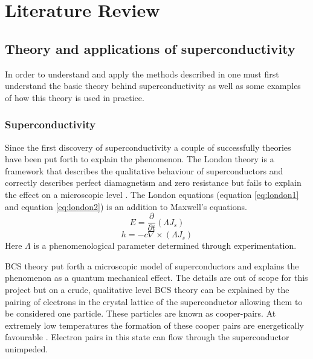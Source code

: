 \graphicspath{{litreview/fig/}}

\chapter{Literature Review}
\label{chap:litreview}


\section{Theory and applications of superconductivity}
In order to understand and apply the methods described in \cite{fluxNoiseSquidsStevenAnton} one must first understand the basic theory behind superconductivity as well as some examples of how this theory is used in practice.

\subsection{Superconductivity}
Since the first discovery of superconductivity a couple of successfully theories have been put forth to explain the phenomenon. The London theory is a framework that describes the qualitative behaviour of superconductors and correctly describes perfect diamagnetism and zero resistance but fails to explain the effect on a microscopic level \cite{Golubov_1998}. The London equations (equation \ref{eq:london1} and equation \ref{eq:london2}) \cite{Tinkham_2015} is an addition to Maxwell's equations.
\begin{equation}
    E = \frac{\partial}{\partial t}(\Lambda J_s)
    \label{eq:london1}
\end{equation}
\begin{equation}
    h = -c \nabla\times (\Lambda J_s)
    \label{eq:london2}
\end{equation}
Here $\Lambda$ is a phenomenological parameter determined through experimentation. \par BCS theory put forth a microscopic model of superconductors and explains the phenomenon as a quantum mechanical effect. The details are out of scope for this project but on a crude, qualitative level BCS theory can be explained by the pairing of electrons in the crystal lattice of the superconductor allowing them to be considered one particle. These particles are known as cooper-pairs. At extremely low temperatures the formation of these cooper pairs are energetically favourable \cite{Feynman_Leighton_Sands_2013}. Electron pairs in this state can flow through the superconductor unimpeded.


